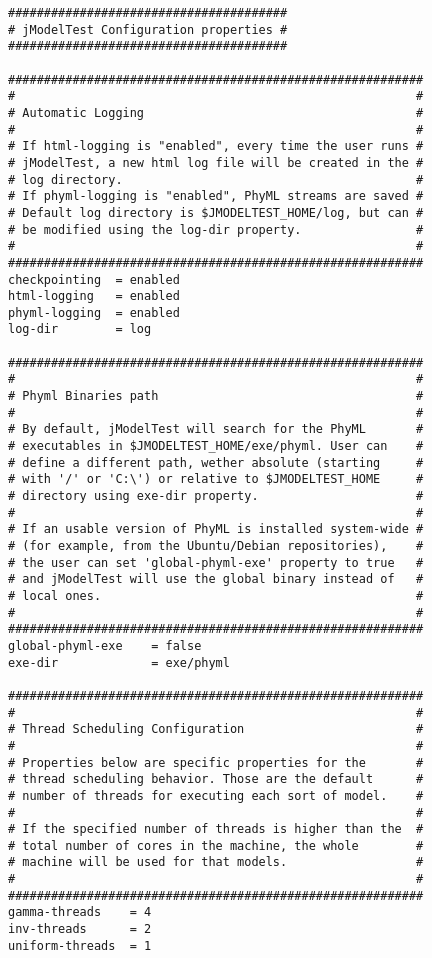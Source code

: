 \begin{verbatim}
#######################################
# jModelTest Configuration properties #
#######################################

##########################################################
#                                                        #
# Automatic Logging                                      #
#                                                        #
# If html-logging is "enabled", every time the user runs #
# jModelTest, a new html log file will be created in the #
# log directory.                                         #
# If phyml-logging is "enabled", PhyML streams are saved #
# Default log directory is $JMODELTEST_HOME/log, but can #
# be modified using the log-dir property.                #
#                                                        #
##########################################################
checkpointing  = enabled
html-logging   = enabled
phyml-logging  = enabled
log-dir        = log

##########################################################
#                                                        #
# Phyml Binaries path                                    #
#                                                        #
# By default, jModelTest will search for the PhyML       #
# executables in $JMODELTEST_HOME/exe/phyml. User can    #
# define a different path, wether absolute (starting     #
# with '/' or 'C:\') or relative to $JMODELTEST_HOME     #
# directory using exe-dir property.                      #
#                                                        #
# If an usable version of PhyML is installed system-wide #
# (for example, from the Ubuntu/Debian repositories),    #
# the user can set 'global-phyml-exe' property to true   #
# and jModelTest will use the global binary instead of   #
# local ones.                                            #
#                                                        #
##########################################################
global-phyml-exe    = false
exe-dir	            = exe/phyml

##########################################################
#                                                        #
# Thread Scheduling Configuration                        #
#                                                        #
# Properties below are specific properties for the       #
# thread scheduling behavior. Those are the default      #
# number of threads for executing each sort of model.    #
#                                                        #
# If the specified number of threads is higher than the  #
# total number of cores in the machine, the whole        #
# machine will be used for that models.                  #
#                                                        #
##########################################################
gamma-threads    = 4
inv-threads      = 2
uniform-threads	 = 1
\end{verbatim}


